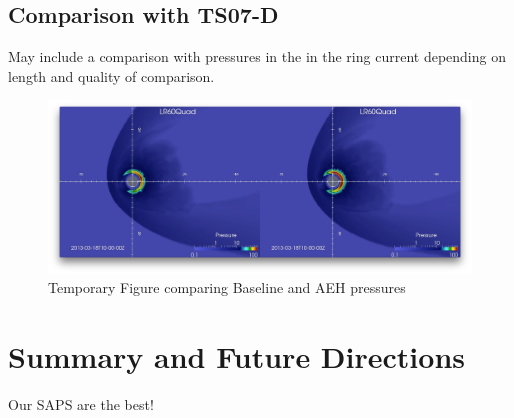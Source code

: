 \documentclass[draft,jgrga]{agutex}
\begin{document}
\begin{article}
 \subsection{Comparison with TS07-D}
 May include a comparison with pressures in the in the ring current depending on length and quality of comparison.
 
\begin{figure}[t]
\noindent\includegraphics[width=39pc]{PressureComparison.png}
\caption{\label{press-fig}
Temporary Figure comparing Baseline and AEH pressures}
\end{figure}


 \section{Summary and Future Directions}
\label{sec-future}

Our SAPS are the best!



%
%
%
%
%
%
%


\end{article}
\end{document}
